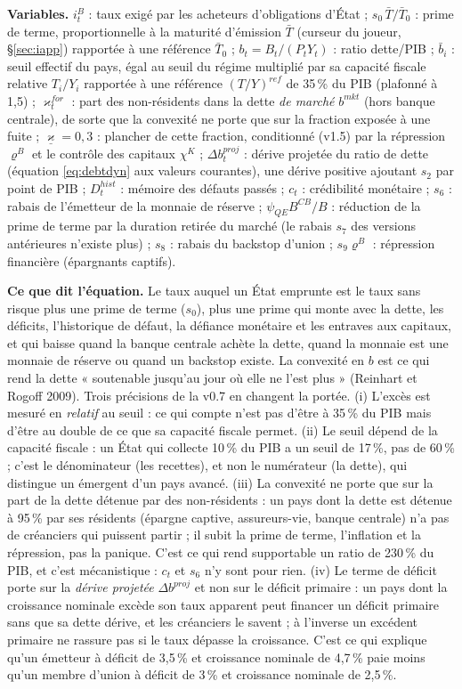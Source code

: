 \documentclass[11pt,a4paper]{article}
\newcommand{\variables}{\par\noindent\textbf{Variables.} }
\newcommand{\sens}{\par\noindent\textbf{Ce que dit l'équation.} }
\begin{document}
\begin{lecture}
\variables $i^B_t$ : taux exigé par les acheteurs d'obligations d'État ; $s_0\,\bar T/\bar T_0$ : prime de terme, proportionnelle à la maturité d'émission $\bar T$ (curseur du joueur, \S\ref{sec:iapp}) rapportée à une référence $\bar T_0$ ; $b_t=B_t/(P_tY_t)$ : ratio dette/PIB ; $\bar b_i$ : seuil effectif du pays, égal au seuil du régime multiplié par sa capacité fiscale relative $T_i/Y_i$ rapportée à une référence $(T/Y)^{ref}$ de 35\,\% du PIB (plafonné à 1,5) ; $\varkappa^{for}_t$ : part des non-résidents dans la dette \emph{de marché} $b^{mkt}$ (hors banque centrale), de sorte que la convexité ne porte que sur la fraction exposée à une fuite ; $\underline\varkappa=0{,}3$ : plancher de cette fraction, conditionné (v1.5) par la répression $\varrho^B$ et le contrôle des capitaux $\chi^K$ ; $\Delta b^{proj}_t$ : dérive projetée du ratio de dette (équation \eqref{eq:debtdyn} aux valeurs courantes), une dérive positive ajoutant $s_2$ par point de PIB ; $D^{hist}_t$ : mémoire des défauts passés ; $c_t$ : crédibilité monétaire ; $s_6$ : rabais de l'émetteur de la monnaie de réserve ; $\psi_{QE}B^{CB}/B$ : réduction de la prime de terme par la duration retirée du marché (le rabais $s_7$ des versions antérieures n'existe plus) ; $s_8$ : rabais du backstop d'union ; $s_9\varrho^B$ : répression financière (épargnants captifs).
\sens Le taux auquel un État emprunte est le taux sans risque plus une prime de terme ($s_0$), plus une prime qui monte avec la dette, les déficits, l'historique de défaut, la défiance monétaire et les entraves aux capitaux, et qui baisse quand la banque centrale achète la dette, quand la monnaie est une monnaie de réserve ou quand un backstop existe. La convexité en $b$ est ce qui rend la dette « soutenable jusqu'au jour où elle ne l'est plus » (Reinhart et Rogoff 2009). Trois précisions de la v0.7 en changent la portée. (i) L'excès est mesuré en \emph{relatif} au seuil : ce qui compte n'est pas d'être à 35\,\% du PIB mais d'être au double de ce que sa capacité fiscale permet. (ii) Le seuil dépend de la capacité fiscale : un État qui collecte 10\,\% du PIB a un seuil de 17\,\%, pas de 60\,\% ; c'est le dénominateur (les recettes), et non le numérateur (la dette), qui distingue un émergent d'un pays avancé. (iii) La convexité ne porte que sur la part de la dette détenue par des non-résidents : un pays dont la dette est détenue à 95\,\% par ses résidents (épargne captive, assureurs-vie, banque centrale) n'a pas de créanciers qui puissent partir ; il subit la prime de terme, l'inflation et la répression, pas la panique. C'est ce qui rend supportable un ratio de 230\,\% du PIB, et c'est mécanistique : $c_t$ et $s_6$ n'y sont pour rien. (iv) Le terme de déficit porte sur la \emph{dérive projetée} $\Delta b^{proj}$ et non sur le déficit primaire : un pays dont la croissance nominale excède son taux apparent peut financer un déficit primaire sans que sa dette dérive, et les créanciers le savent ; à l'inverse un excédent primaire ne rassure pas si le taux dépasse la croissance. C'est ce qui explique qu'un émetteur à déficit de 3,5\,\% et croissance nominale de 4,7\,\% paie moins qu'un membre d'union à déficit de 3\,\% et croissance nominale de 2,5\,\%.

\end{lecture}
\end{document}

